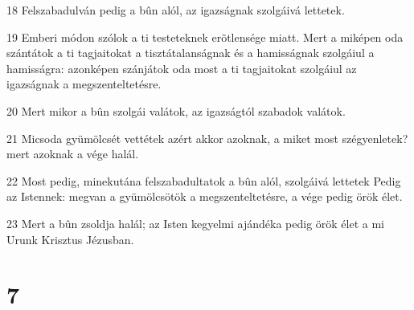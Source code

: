 \par 18 Felszabadulván pedig a bûn alól, az igazságnak szolgáivá lettetek.
\par 19 Emberi módon szólok a ti testeteknek erõtlensége miatt. Mert a miképen oda szántátok a ti tagjaitokat a tisztátalanságnak és a hamisságnak szolgáiul a hamisságra: azonképen szánjátok oda most a ti tagjaitokat szolgáiul az igazságnak a megszenteltetésre.
\par 20 Mert mikor a bûn szolgái valátok, az igazságtól szabadok valátok.
\par 21 Micsoda gyümölcsét vettétek azért akkor azoknak, a miket most szégyenletek? mert azoknak a vége halál.
\par 22 Most pedig, minekutána felszabadultatok a bûn alól, szolgáivá lettetek Pedig az Istennek: megvan a gyümölcsötök a megszenteltetésre, a vége pedig örök élet.
\par 23 Mert a bûn zsoldja halál; az Isten kegyelmi ajándéka pedig örök élet a mi Urunk Krisztus Jézusban.

\chapter{7}

